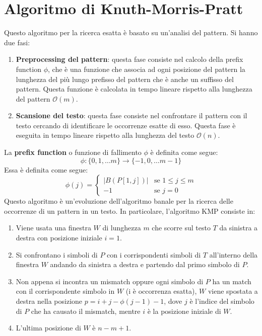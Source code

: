 \section{Algoritmo di Knuth-Morris-Pratt}
Questo algoritmo per la ricerca esatta è basato su un'analisi del pattern. Si hanno due fasi:
\begin{enumerate}
    \item \textbf{Preprocessing del pattern}: questa fase consiste nel calcolo
          della prefix function $\phi$, che è una funzione che associa ad ogni posizione
          del pattern la lunghezza del più lungo prefisso del pattern che è anche un
          suffisso del pattern. Questa funzione è calcolata in tempo lineare rispetto
          alla lunghezza del pattern $\mathcal{O}(m)$.
    \item \textbf{Scansione del testo}: questa fase consiste nel confrontare il
          pattern con il testo cercando di identificare le occorrenze esatte di esso.
          Questa fase è eseguita in tempo lineare rispetto alla lunghezza del testo $\mathcal{O}(n)$.
\end{enumerate}
La \textbf{prefix function} o funzione di fallimento $\phi$ è definita come segue:
\begin{equation}
    \phi: \{0, 1, \dots m\} \to \{-1, 0, \dots m-1\}
\end{equation}
Essa è definita come segue:
\begin{equation}
    \phi(j) = \begin{cases} |B(P[1, j])| & \text{se } 1 \leq j \leq m \\-1 & \text{se } j = 0 \end{cases}
\end{equation}
Questo algoritmo è un’evoluzione dell'algoritmo banale per la ricerca delle
occorrenze di un pattern in un testo. In particolare, l'algoritmo KMP consiste in:
\begin{enumerate}
    \item Viene usata una finestra $W$ di lunghezza $m$ che scorre sul testo $T$
          da sinistra a destra con posizione iniziale $i = 1$.
    \item Si confrontano i simboli di $P$ con i corrispondenti simboli di $T$
          all'interno della finestra $W$ andando da sinistra a destra e partendo
          dal primo simbolo di $P$.
    \item Non appena si incontra un mismatch oppure ogni simbolo di $P$ ha un
          match con il corrispondente simbolo in $W$ (i è occorrenza esatta), $W$ viene
          spostata a destra nella posizione $p = i + j - \phi(j - 1) - 1$, dove $j$ è
          l'indice del simbolo di $P$ che ha causato il mismatch, mentre $i$ è
          la posizione iniziale di $W$.
    \item L'ultima posizione di $W$ è $n - m + 1$.
\end{enumerate}
